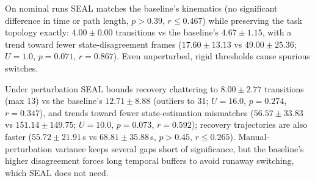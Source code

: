 On nominal runs SEAL matches the baseline's kinematics (no significant difference in time or path length, $p>0.39$, $r\le0.467$) while preserving the task topology exactly: $4.00\pm0.00$ transitions vs the baseline's $4.67\pm1.15$, with a trend toward fewer state-disagreement frames ($17.60\pm13.13$ vs $49.00\pm25.36$; $U{=}1.0$, $p{=}0.071$, $r{=}0.867$). Even unperturbed, rigid thresholds cause spurious switches.

Under perturbation SEAL bounds recovery chattering to $8.00\pm2.77$ transitions (max 13) vs the baseline's $12.71\pm8.88$ (outliers to 31; $U{=}16.0$, $p{=}0.274$, $r{=}0.347$), and trends toward fewer state-estimation mismatches ($56.57\pm33.83$ vs $151.14\pm149.75$; $U{=}10.0$, $p{=}0.073$, $r{=}0.592$); recovery trajectories are also faster ($55.72\pm21.91$\,s vs $68.81\pm35.88$\,s, $p>0.45$, $r\le0.265$). Manual-perturbation variance keeps several gaps short of significance, but the baseline's higher disagreement forces long temporal buffers to avoid runaway switching, which SEAL does not need.
